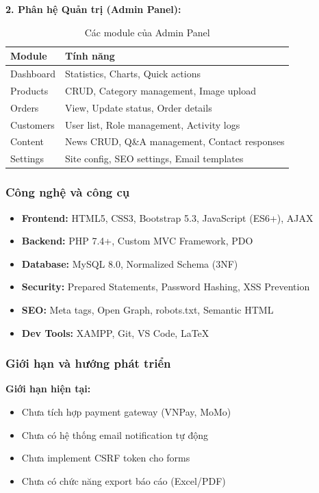 \textbf{2. Phân hệ Quản trị (Admin Panel):}
\begin{table}[H]
\centering
\begin{tabular}{|l|p{8cm}|}
\hline
\textbf{Module} & \textbf{Tính năng} \\
\hline
Dashboard & Statistics, Charts, Quick actions \\
\hline
Products & CRUD, Category management, Image upload \\
\hline
Orders & View, Update status, Order details \\
\hline
Customers & User list, Role management, Activity logs \\
\hline
Content & News CRUD, Q\&A management, Contact responses \\
\hline
Settings & Site config, SEO settings, Email templates \\
\hline
\end{tabular}
\caption{Các module của Admin Panel}
\label{tab:admin-modules}
\end{table}

\subsubsection{Công nghệ và công cụ}

\begin{itemize}
    \item \textbf{Frontend:} HTML5, CSS3, Bootstrap 5.3, JavaScript (ES6+), AJAX
    \item \textbf{Backend:} PHP 7.4+, Custom MVC Framework, PDO
    \item \textbf{Database:} MySQL 8.0, Normalized Schema (3NF)
    \item \textbf{Security:} Prepared Statements, Password Hashing, XSS Prevention
    \item \textbf{SEO:} Meta tags, Open Graph, robots.txt, Semantic HTML
    \item \textbf{Dev Tools:} XAMPP, Git, VS Code, LaTeX 
\end{itemize}

\subsubsection{Giới hạn và hướng phát triển}

\textbf{Giới hạn hiện tại:}
\begin{itemize}
    \item Chưa tích hợp payment gateway (VNPay, MoMo)
    \item Chưa có hệ thống email notification tự động
    \item Chưa implement CSRF token cho forms
    \item Chưa có chức năng export báo cáo (Excel/PDF)
\end{itemize}

